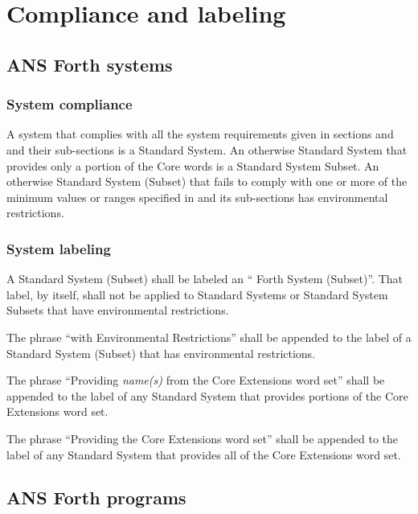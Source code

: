 \chapter{Compliance and labeling}
\label{label}

\cbstart{}
\section[Forth systems]{ANS Forth systems} %
\label{label:label}
\cbend

\subsection{System compliance} %
\label{label:system}

A system that complies with all the system requirements given in
sections  and  and their sub-sections is
a Standard System. An otherwise Standard System that provides only
a portion of the Core words is a Standard System Subset. An
otherwise Standard System (Subset) that fails to comply with one or
more of the minimum values or ranges specified in  and
its sub-sections has environmental restrictions.

\subsection{System labeling} %

A Standard System (Subset) shall be labeled an `` Forth System
(Subset)''. That label, by itself, shall not be applied to Standard
Systems or Standard System Subsets that have environmental
restrictions.

The phrase ``with Environmental Restrictions'' shall be appended to
the label of a Standard System (Subset) that has environmental
restrictions.

The phrase ``Providing \emph{name(s)} from the Core Extensions word
set'' shall be appended to the label of any Standard System that
provides portions of the Core Extensions word set.

The phrase ``Providing the Core Extensions word set'' shall be
appended to the label of any Standard System that provides all of
the Core Extensions word set.

\cbstart{}
\section[Forth programs]{ANS Forth programs} %
\cbend
